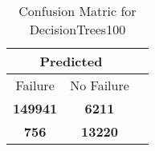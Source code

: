 \begin{table}[] 
\caption{Confusion Matric for DecisionTrees100} 
\label{Table: Prediction Accuracy-NoneDecisionTrees10095.0EKF-ignoreReflection-Reflection} 
\centering 
\begin{tabular} 
 {@{}ccc@{}} 
\toprule 
\multicolumn{2}{c}{\textbf{Predicted}}
 \\ \midrule 
\multicolumn{1}{|c|}{Failure} & 
\multicolumn{1}{c|}{No Failure}
 \\ \midrule 
\multicolumn{1}{|c|}{\color{green}\textbf{149941}} & 
\multicolumn{1}{c|}{\color{red}\textbf{6211}}
 \\ \midrule 
\multicolumn{1}{|c|}{\color{red}\textbf{756}} & 
\multicolumn{1}{c|}{\color{green}\textbf{13220}}
 \\ \bottomrule 
\end{tabular} 
\end{table} 
